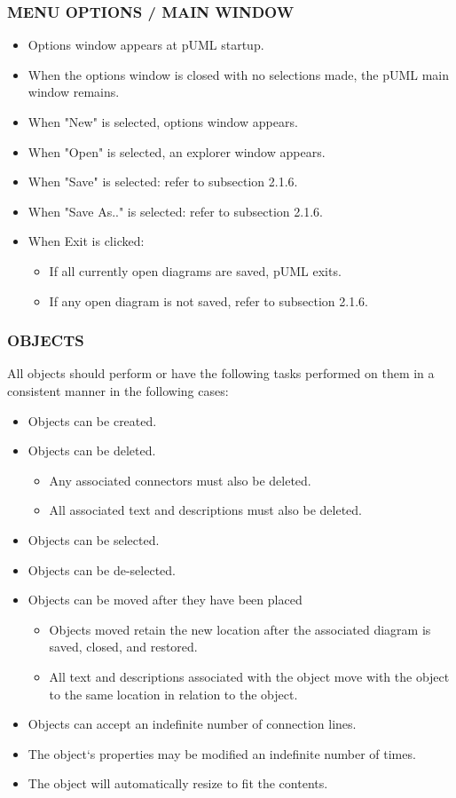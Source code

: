 \documentclass[twoside,letterpaper]{article}
\begin{document}
\subsubsection[MENU OPTIONS / MAIN WINDOW]
{\bfseries MENU OPTIONS / MAIN WINDOW} 
{
\begin{itemize}
\item Options window appears at pUML startup.
\item When the options window is closed with no selections made, the pUML main window remains.
\item When "New" is selected, options window appears.
\item When "Open" is selected, an explorer window appears.
\item When "Save" is selected: refer to subsection 2.1.6.
\item When "Save As.." is selected: refer to subsection 2.1.6.
\item When Exit is clicked:
\begin{itemize}
\item If all currently open diagrams are saved, pUML exits.
\item If any open diagram is not saved, refer to subsection 2.1.6.
\end{itemize}
\end{itemize}
\bigskip

\subsubsection[OBJECTS]{\bfseries OBJECTS} 

All objects should perform or have the following tasks performed on them in a consistent manner in the following cases: 
\begin{itemize}
	\item Objects can be created.
	\item Objects can be deleted.
\begin{itemize}
\item Any associated connectors must also be deleted.
\item All associated text and descriptions must also be deleted.
\end{itemize}
	\item Objects can be selected.
	\item Objects can be de-selected.
	\item Objects can be moved after they have been placed
\begin{itemize}
\item Objects moved retain the new location after the associated diagram is saved, closed, and restored.
\item All text and descriptions associated with the object move with the object to the same location in relation to the object.
\end{itemize}
\item Objects can accept an indefinite number of connection lines.
\item The object`s properties may be modified an indefinite number of times.
\item The object will automatically resize to fit the contents.
\end{itemize}

}
\end{document}
